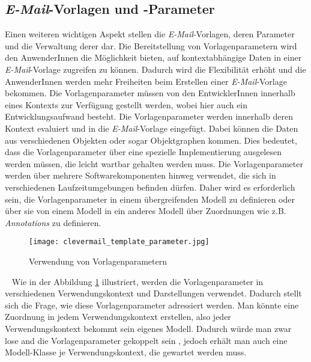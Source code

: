 \subsection{\emph{E-Mail}-Vorlagen und -Parameter}
Einen weiteren wichtigen Aspekt stellen die \emph{E-Mail}-Vorlagen, deren Parameter und die Verwaltung derer dar. Die Bereitstellung von Vorlagenparametern wird den AnwenderInnen die Möglichkeit bieten, auf kontextabhängige Daten in einer \emph{E-Mail}-Vorlage zugreifen zu können. Dadurch wird die Flexibilität erhöht und die AnwenderInnen werden mehr Freiheiten beim Erstellen einer \emph{E-Mail}-Vorlage bekommen. 
\newline
\newline
Die Vorlagenparameter müssen von den EntwicklerInnen innerhalb eines Kontexts zur Verfügung gestellt werden, wobei hier auch ein Entwicklungsaufwand besteht. Die Vorlagenparameter werden innerhalb deren Kontext evaluiert und in die \emph{E-Mail}-Vorlage eingefügt. Dabei können die Daten aus verschiedenen Objekten oder sogar Objektgraphen kommen. Dies bedeutet, dass die Vorlagenparameter über eine spezielle Implementierung ausgelesen werden müssen, die leicht wartbar gehalten werden muss. 
\newline
\newline
Die Vorlagenparameter werden über mehrere Softwarekomponenten hinweg verwendet, die sich in verschiedenen Laufzeitumgebungen befinden dürfen. Daher wird es erforderlich sein, die Vorlagenparameter in einem übergreifenden Modell zu definieren oder über sie von einem Modell in ein anderes Modell über Zuordnungen wie z.B. \emph{Annotations} zu definieren.
\begin{figure}[h]
\centering
\texttt{[image: clevermail\_template\_parameter.jpg]}
\caption{Verwendung von Vorlagenparametern}
\label{fig:clevermail-template-parameter}
\end{figure}
\ \newline
Wie in der Abbildung \ref{fig:clevermail-template-parameter} illustriert, werden die Vorlagenparameter in verschiedenen Verwendungskontext und Darstellungen verwendet. Dadurch stellt sich die Frage, wie diese Vorlagenparameter adressiert werden. Man könnte eine Zuordnung in jedem Verwendungskontext erstellen, also jeder Verwendungskontext bekommt sein eigenes Modell. Dadurch würde man zwar lose and die Vorlagenparameter gekoppelt sein , jedoch erhält man auch eine Modell-Klasse je Verwendungskontext, die gewartet werden muss. 

